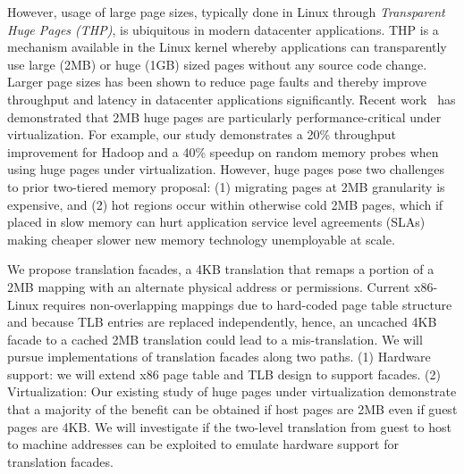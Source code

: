 However, usage of large page sizes, typically done in Linux through {\it
Transparent Huge Pages (THP)}, is ubiquitous in modern datacenter applications.
THP is a mechanism available in the Linux kernel whereby applications can
transparently use large (2MB) or huge (1GB) sized pages without any source code
change. Larger page sizes has been shown to reduce page faults and thereby
improve throughput and latency in datacenter applications significantly.  Recent
work~\cite{JeffPaper} has demonstrated that 2MB huge pages are particularly
performance-critical under virtualization.  For example, our study demonstrates
a 20\% throughput improvement for Hadoop and a 40\% speedup on random memory
probes when using huge pages under virtualization.  However, huge pages pose two
challenges to prior two-tiered memory proposal: (1) migrating pages at 2MB
granularity is expensive, and (2) hot regions occur within otherwise cold 2MB
pages, which if placed in slow memory can hurt application service level
agreements (SLAs) making cheaper slower new memory technology unemployable at
scale.

We propose translation facades, a 4KB translation that remaps a portion of a 2MB
mapping with an alternate physical address or permissions.  Current x86-Linux
requires non-overlapping mappings due to hard-coded page table structure and
because TLB entries are replaced independently, hence, an uncached 4KB facade to
a cached 2MB translation could lead to a mis-translation. We will pursue
implementations of translation facades along two paths. (1) Hardware support: we
will extend x86 page table and TLB design to support facades. (2)
Virtualization: Our existing study of huge pages under virtualization
demonstrate that a majority of the benefit can be obtained if host pages are 2MB
even if guest pages are 4KB.  We will investigate if the two-level translation
from guest to host to machine addresses can be exploited to emulate hardware
support for translation facades.
